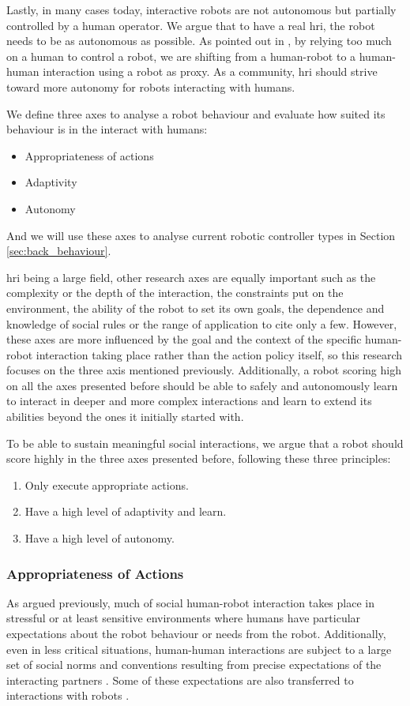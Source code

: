     Lastly, in many cases today, interactive robots are not autonomous but partially controlled by a human operator. We argue that to have a real \acrlong{hri}, the robot needs to be as autonomous as possible. As pointed out in \citet{baxter2016characterising}, by relying too much on a human to control a robot, we are shifting from a human-robot to a human-human interaction using a robot as proxy. As a community, \gls{hri} should strive toward more autonomy for robots interacting with humans.
    
    We define three axes to analyse a robot behaviour and evaluate how suited its behaviour is in the interact with humans:
    \begin{itemize}
    	\item Appropriateness of actions
    	\item Adaptivity
    	\item Autonomy
    \end{itemize}
    And we will use these axes to analyse current robotic controller types in Section \ref{sec:back_behaviour}.    
    
    \gls{hri} being a large field, other research axes are equally important such as the complexity or the depth of the interaction, the constraints put on the environment, the ability of the robot to set its own goals, the dependence and knowledge of social rules or the range of application to cite only a few. However, these axes are more influenced by the goal and the context of the specific human-robot interaction taking place rather than the action policy itself, so this research focuses on the three axis mentioned previously. Additionally, a robot scoring high on all the axes presented before should be able to safely and autonomously learn to interact in deeper and more complex interactions and learn to extend its abilities beyond the ones it initially started with.

	To be able to sustain meaningful social interactions, we argue that a robot should score highly in the three axes presented before, following these three principles:
	\begin{enumerate}
		\item Only execute appropriate actions.
		\item Have a high level of adaptivity and learn.
		\item Have a high level of autonomy.
	\end{enumerate}

\subsubsection{Appropriateness of Actions} \label{ssec:appropriateness} %
    As argued previously, much of social human-robot interaction takes place in  stressful or at least sensitive environments where humans have particular expectations about the robot behaviour or needs from the robot. Additionally, even in less critical situations, human-human interactions are subject to a large set of social norms and conventions resulting from precise expectations of the interacting partners \citep{sherif1936psychology}. Some of these expectations are also transferred to interactions with robots \citep{bartneck2004design}.
	

